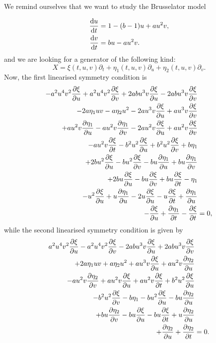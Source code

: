 We remind ourselves that we want to study the Brusselator model

\begin{equation*}
  \begin{split}
    \dv{u}{t}&=1-(b-1)u+au^2 v,\\
    \dv{v}{t}&=bu-au^2 v.\\
    \end{split}
\end{equation*}
and we are looking for a generator of the following kind:
\begin{equation}
X=\xi(t,u,v)\partial_t+\eta_1(t,u,v)\partial_u+\eta_2(t,u,v)\partial_v.
\end{equation}
Now, the first linearised symmetry condition is
\begin{align}
  - a^{2} u^{4} v^{2} \pdv{\xi}{u} + a^{2} u^{4} v^{2} \pdv{\xi}{v} + 2 a b u^{3} v \pdv{\xi}{u} - 2 a b u^{3} v \pdv{\xi}{v}&\nonumber\\
  - 2 a \eta_1 u v - a \eta_2 u^{2} - 2 a u^{3} v \pdv{\xi}{u} + a u^{3} v \pdv{\xi}{v}&\nonumber\\
  + a u^{2} v \pdv{\eta_1}{u} - a u^{2} v \pdv{\eta_1}{v} - 2 a u^{2} v \pdv{\xi}{u} + a u^{2} v \pdv{\xi}{v}&\nonumber\\
  - a u^{2} v \pdv{\xi}{t} - b^{2} u^{2} \pdv{\xi}{u} + b^{2} u^{2} \pdv{\xi}{v} + b \eta_1&\nonumber\\
  + 2 b u^{2} \pdv{\xi}{u} - b u^{2} \pdv{\xi}{v} - b u \pdv{\eta_1}{u} + b u \pdv{\eta_1}{v} &\nonumber\\
  + 2 b u \pdv{\xi}{u} - b u \pdv{\xi}{v} + b u \pdv{\xi}{t} - \eta_1&\nonumber\\
  - u^{2} \pdv{\xi}{u} + u \pdv{\eta_1}{u} - 2 u \pdv{\xi}{u} - u \pdv{\xi}{t} + \pdv{\eta_1}{u}&\nonumber\\
  - \pdv{\xi}{u} + \pdv{\eta_1}{t} - \pdv{\xi}{t}&=0,\label{eq:Brusselator_lin_sym_1}
\end{align}
while the second linearised symmetry condition is given by
\begin{align}
  a^{2} u^{4} v^{2} \pdv{\xi}{u} - a^{2} u^{4} v^{2} \pdv{\xi}{v} - 2 a b u^{3} v \pdv{\xi}{u} + 2 a b u^{3} v \pdv{\xi}{v}&\nonumber\\
  + 2 a \eta_1 u v + a \eta_2 u^{2} + a u^{3} v \pdv{\xi}{u} + a u^{2} v \pdv{\eta_2}{u}&\nonumber\\
  - a u^{2} v \pdv{\eta_2}{v} + a u^{2} v \pdv{\xi}{u} + a u^{2} v \pdv{\xi}{t} + b^{2} u^{2} \pdv{\xi}{u}&\nonumber\\
  - b^{2} u^{2} \pdv{\xi}{v} - b \eta_1 - b u^{2} \pdv{\xi}{u} - b u \pdv{\eta_2}{u}&\nonumber\\
  + b u \pdv{\eta_2}{v} - b u \pdv{\xi}{u} - b u \pdv{\xi}{t} + u \pdv{\eta_2}{u}&\nonumber\\
  + \pdv{\eta_2}{u} + \pdv{\eta_2}{t}&=0.\label{eq:Brusselator_lin_sym_2}
\end{align}


